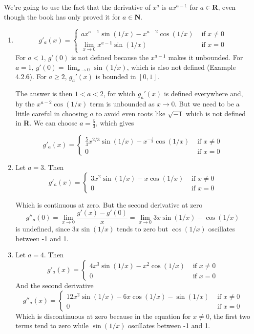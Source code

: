 \documentclass{oxmathproblems}
\begin{document}
\begin{questions}
\begin{solution}
  We're going to use the fact that the derivative of $x^a$ is $ax^{a-1}$ for $a \in \textbf{R}$, even though the book has only proved it for $a \in \textbf{N}$.
  \begin{enumerate}[label=(\alph*)]
    \item
    \[
      g'_{a}(x) = 
      \begin{cases}
        ax^{a-1}\sin(1/x) - x^{a-2}\cos(1/x) & \text{ if } x \neq 0\\
        \lim_{x \to 0} x^{a-1}\sin(1/x) & \text{ if } x = 0
      \end{cases}
    \]
    For $a < 1$, $g'(0)$ is not defined because the $x^{a-1}$ makes it unbounded. For $a=1$, $g'(0)=\lim_{x \to 0}\sin(1/x)$, which is also not defined (Example 4.2.6).
    For $a \geq 2$, $g_{a}'(x)$ is bounded in $[0, 1]$.
  
    The answer is then $1 < a < 2$, for which $g_{a}'(x)$ is defined everywhere and, by the $x^{a-2}\cos(1/x)$ term is unbounded as 
    $x \to 0$. But we need to be a little careful in choosing $a$ to avoid even roots
    like $\sqrt{-1}$ which is not defined in \textbf{R}. We can choose $a=\frac{5}{3}$, which gives

    \[
      g'_{a}(x) = 
      \begin{cases}
        \frac{5}{3}x^{2/3}\sin(1/x) - x^{-\frac{1}{3}}\cos(1/x) & \text{ if } x \neq 0\\
        0 & \text{ if } x = 0
      \end{cases}
    \]

   \item Let $a=3$. Then
   \[
      g'_{a}(x) = 
      \begin{cases}
        3x^{2} \sin(1/x) - x \cos(1/x) & \text{ if } x \neq 0\\
        0 & \text{ if } x = 0
      \end{cases}
   \]

   Which is continuous at zero. But the second derivative at zero
   \[
     g''_{a}(0) = \lim_{x \to 0}\frac{g'(x)-g'(0)}{x} = \lim_{x \to 0} 3x \sin(1/x) - \cos(1/x)
   \]
   is undefined, since $3x \sin(1/x)$ tends to zero but $\cos(1/x)$ oscillates between -1 and 1.
  
  \item Let $a=4$. Then
   \[
      g'_{a}(x) = 
      \begin{cases}
        4x^{3} \sin(1/x) - x^{2} \cos(1/x) & \text{ if } x \neq 0\\
        0 & \text{ if } x = 0
      \end{cases}
   \]
   And the second derivative
   \[
      g''_{a}(x) = 
      \begin{cases}
        12x^{2} \sin(1/x) - 6x \cos(1/x) - \sin(1/x) & \text{ if } x \neq 0\\
        0 & \text{ if } x = 0
      \end{cases}
   \]
   Which is discontinuous at zero because in the equation for $x \neq 0$, the first two terms tend to zero while $\sin(1/x)$ oscillates between -1 and 1.
  \end{enumerate}
\end{solution}


\end{questions}
\end{document}
